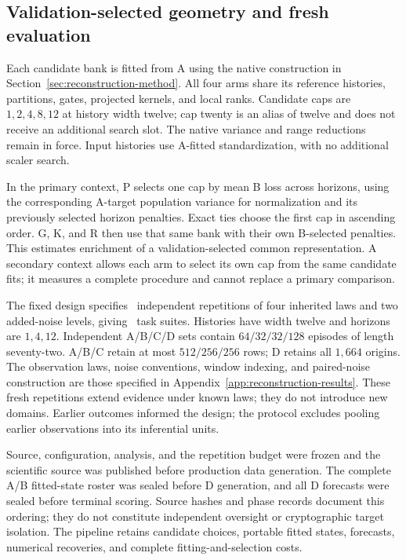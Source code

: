 \subsection{Validation-selected geometry and fresh evaluation}

Each candidate bank is fitted from A using the native construction in
Section~\ref{sec:reconstruction-method}. All four arms share its
reference histories, partitions, gates, projected kernels, and local
ranks. Candidate caps are $1,2,4,8,12$ at history width twelve; cap twenty
is an alias of twelve and does not receive an additional search slot.
The native variance and range reductions remain in force. Input
histories use A-fitted standardization, with no additional scaler search.

In the primary context, P selects one cap by mean B loss across horizons,
using the corresponding A-target population variance for normalization
and its previously selected horizon penalties. Exact ties choose the
first cap in ascending order. G, K, and R then use that same bank with
their own B-selected penalties. This estimates enrichment of a
validation-selected common representation. A secondary context allows
each arm to select its own cap from the same candidate fits; it measures
a complete procedure and cannot replace a primary comparison.

The fixed design specifies \SARepetitions\ independent repetitions of
four inherited laws and two added-noise levels, giving \SATasks\ task
suites. Histories have width twelve and horizons are $1,4,12$.
Independent A/B/C/D sets contain $64/32/32/128$ episodes of length
seventy-two. A/B/C retain at most $512/256/256$ rows; D retains all
$1,664$ origins. The observation laws, noise conventions, window
indexing, and paired-noise construction are those specified in
Appendix~\ref{app:reconstruction-results}. These fresh repetitions
extend evidence under known laws; they do not introduce new domains.
Earlier outcomes informed the design; the protocol excludes pooling earlier
observations into its inferential units.

Source, configuration, analysis, and the repetition budget were frozen
and the scientific source was published before production data generation.
The complete A/B fitted-state roster was sealed before D generation,
and all D forecasts were sealed before terminal scoring.
Source hashes and phase records document this ordering;
they do not constitute independent oversight or cryptographic target
isolation. The pipeline retains candidate choices, portable fitted states,
forecasts, numerical recoveries, and complete fitting-and-selection costs.

